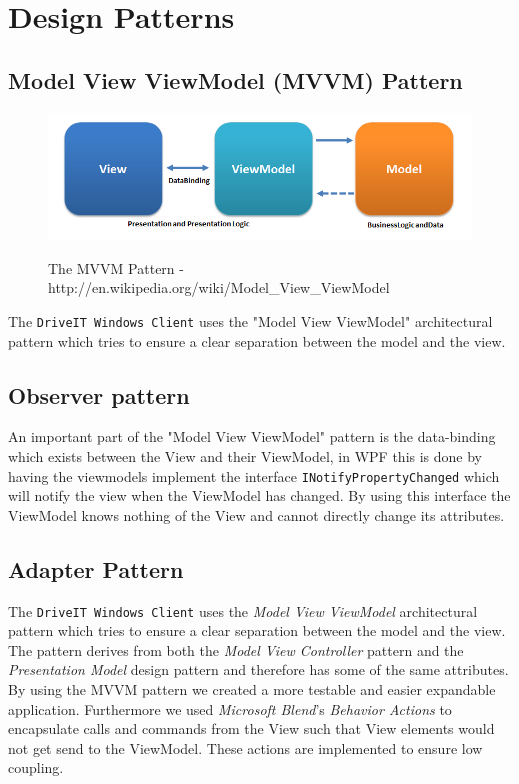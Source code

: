 \section{Design Patterns}
\subsection{Model View ViewModel (MVVM) Pattern}
\begin{figure}[H]
	\centering
	\includegraphics[scale=0.6]{Figures/WebImages/MVVMPattern}\\
	\caption{The MVVM Pattern - http://en.wikipedia.org/wiki/Model\_View\_ViewModel}
	\label{fig:MVVMPattern}
\end{figure}
The \texttt{DriveIT Windows Client} uses the "Model View ViewModel" architectural pattern which tries to ensure a clear separation between the model and the view. 
\subsection{Observer pattern}
An important part of the "Model View ViewModel" pattern is the data-binding which exists between the View and their ViewModel, in WPF this is done by having the viewmodels implement the interface \texttt{INotifyPropertyChanged} which will notify the view when the ViewModel has changed. By using this interface the ViewModel knows nothing of the View and cannot directly change its attributes.

\subsection{Adapter Pattern}
The \texttt{DriveIT Windows Client} uses the \textit{Model View ViewModel} architectural pattern which tries to ensure a clear separation between the model and the view. The pattern derives from both the \textit{Model View Controller} pattern and the \textit{Presentation Model} design pattern and therefore has some of the same attributes. By using the MVVM pattern we created a more testable and easier expandable application. Furthermore we used \textit{Microsoft Blend}'s \textit{Behavior Actions} to encapsulate calls and commands from the View such that View elements would not get send to the ViewModel. These actions are implemented to ensure low coupling.\\

